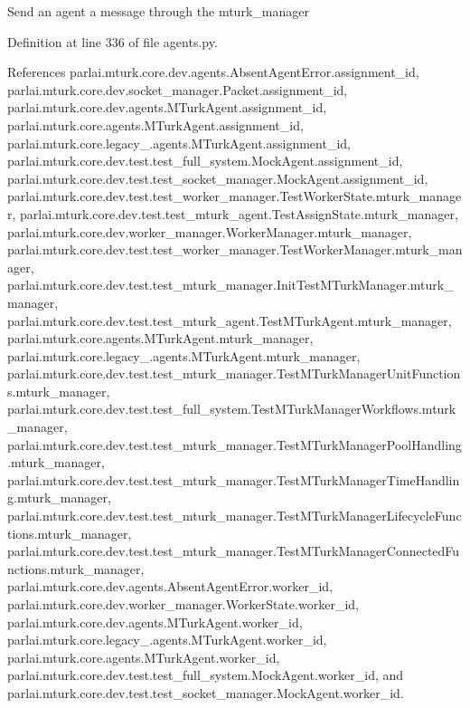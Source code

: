 \begin{DoxyVerb}Send an agent a message through the mturk_manager\end{DoxyVerb}
 

Definition at line 336 of file agents.\+py.



References parlai.\+mturk.\+core.\+dev.\+agents.\+Absent\+Agent\+Error.\+assignment\+\_\+id, parlai.\+mturk.\+core.\+dev.\+socket\+\_\+manager.\+Packet.\+assignment\+\_\+id, parlai.\+mturk.\+core.\+dev.\+agents.\+M\+Turk\+Agent.\+assignment\+\_\+id, parlai.\+mturk.\+core.\+agents.\+M\+Turk\+Agent.\+assignment\+\_\+id, parlai.\+mturk.\+core.\+legacy\+\_.\+agents.\+M\+Turk\+Agent.\+assignment\+\_\+id, parlai.\+mturk.\+core.\+dev.\+test.\+test\+\_\+full\+\_\+system.\+Mock\+Agent.\+assignment\+\_\+id, parlai.\+mturk.\+core.\+dev.\+test.\+test\+\_\+socket\+\_\+manager.\+Mock\+Agent.\+assignment\+\_\+id, parlai.\+mturk.\+core.\+dev.\+test.\+test\+\_\+worker\+\_\+manager.\+Test\+Worker\+State.\+mturk\+\_\+manager, parlai.\+mturk.\+core.\+dev.\+test.\+test\+\_\+mturk\+\_\+agent.\+Test\+Assign\+State.\+mturk\+\_\+manager, parlai.\+mturk.\+core.\+dev.\+worker\+\_\+manager.\+Worker\+Manager.\+mturk\+\_\+manager, parlai.\+mturk.\+core.\+dev.\+test.\+test\+\_\+worker\+\_\+manager.\+Test\+Worker\+Manager.\+mturk\+\_\+manager, parlai.\+mturk.\+core.\+dev.\+test.\+test\+\_\+mturk\+\_\+manager.\+Init\+Test\+M\+Turk\+Manager.\+mturk\+\_\+manager, parlai.\+mturk.\+core.\+dev.\+test.\+test\+\_\+mturk\+\_\+agent.\+Test\+M\+Turk\+Agent.\+mturk\+\_\+manager, parlai.\+mturk.\+core.\+agents.\+M\+Turk\+Agent.\+mturk\+\_\+manager, parlai.\+mturk.\+core.\+legacy\+\_.\+agents.\+M\+Turk\+Agent.\+mturk\+\_\+manager, parlai.\+mturk.\+core.\+dev.\+test.\+test\+\_\+mturk\+\_\+manager.\+Test\+M\+Turk\+Manager\+Unit\+Functions.\+mturk\+\_\+manager, parlai.\+mturk.\+core.\+dev.\+test.\+test\+\_\+full\+\_\+system.\+Test\+M\+Turk\+Manager\+Workflows.\+mturk\+\_\+manager, parlai.\+mturk.\+core.\+dev.\+test.\+test\+\_\+mturk\+\_\+manager.\+Test\+M\+Turk\+Manager\+Pool\+Handling.\+mturk\+\_\+manager, parlai.\+mturk.\+core.\+dev.\+test.\+test\+\_\+mturk\+\_\+manager.\+Test\+M\+Turk\+Manager\+Time\+Handling.\+mturk\+\_\+manager, parlai.\+mturk.\+core.\+dev.\+test.\+test\+\_\+mturk\+\_\+manager.\+Test\+M\+Turk\+Manager\+Lifecycle\+Functions.\+mturk\+\_\+manager, parlai.\+mturk.\+core.\+dev.\+test.\+test\+\_\+mturk\+\_\+manager.\+Test\+M\+Turk\+Manager\+Connected\+Functions.\+mturk\+\_\+manager, parlai.\+mturk.\+core.\+dev.\+agents.\+Absent\+Agent\+Error.\+worker\+\_\+id, parlai.\+mturk.\+core.\+dev.\+worker\+\_\+manager.\+Worker\+State.\+worker\+\_\+id, parlai.\+mturk.\+core.\+dev.\+agents.\+M\+Turk\+Agent.\+worker\+\_\+id, parlai.\+mturk.\+core.\+legacy\+\_.\+agents.\+M\+Turk\+Agent.\+worker\+\_\+id, parlai.\+mturk.\+core.\+agents.\+M\+Turk\+Agent.\+worker\+\_\+id, parlai.\+mturk.\+core.\+dev.\+test.\+test\+\_\+full\+\_\+system.\+Mock\+Agent.\+worker\+\_\+id, and parlai.\+mturk.\+core.\+dev.\+test.\+test\+\_\+socket\+\_\+manager.\+Mock\+Agent.\+worker\+\_\+id.

